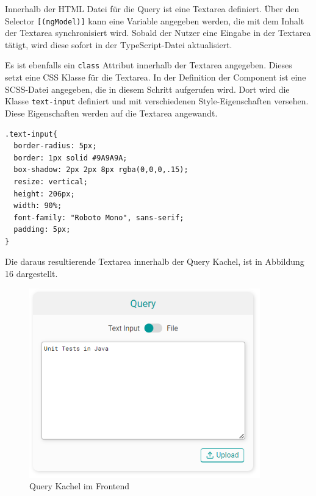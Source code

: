 Innerhalb der HTML Datei für die Query ist eine Textarea definiert. Über den Selector \texttt{[(ngModel)]} kann eine Variable angegeben werden, die mit dem Inhalt der Textarea synchronisiert wird. Sobald der Nutzer eine Eingabe in der Textarea tätigt, wird diese sofort in der TypeScript-Datei aktualisiert. 

Es ist ebenfalls ein \texttt{class} Attribut innerhalb der Textarea angegeben. Dieses setzt eine CSS Klasse für die Textarea. In der Definition der Component ist eine SCSS-Datei angegeben, die in diesem Schritt aufgerufen wird. Dort wird die Klasse \texttt{text-input} definiert und mit verschiedenen Style-Eigenschaften versehen. Diese Eigenschaften werden auf die Textarea angewandt.  

\begin{lstlisting}[caption={Style-Definition innerhalb einer SCSS-Datei}]
.text-input{
  border-radius: 5px;
  border: 1px solid #9A9A9A;
  box-shadow: 2px 2px 8px rgba(0,0,0,.15);
  resize: vertical;
  height: 206px;
  width: 90%;
  font-family: "Roboto Mono", sans-serif;
  padding: 5px;
}
\end{lstlisting}

Die daraus resultierende Textarea innerhalb der \glqq Query\grqq{} Kachel, ist in Abbildung 16 dargestellt.

\begin{figure}[H]
  \centering
    \includegraphics[width = 10cm]{bilder/websiteQuery}
    \caption{Query Kachel im Frontend}
\end{figure}

